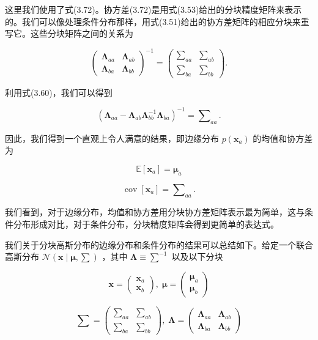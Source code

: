 \documentclass[10pt]{report}
\begin{document}
这里我们使用了式(3.72)。协方差(3.72)是用式(3.53)给出的分块精度矩阵来表示的。我们可以像处理条件分布那样，用式(3.51)给出的协方差矩阵的相应分块来重写它。这些分块矩阵之间的关系为

\[
{\left( \begin{array}{ll} {\mathbf{\Lambda }}_{aa} & {\mathbf{\Lambda }}_{ab} \\  {\mathbf{\Lambda }}_{ba} & {\mathbf{\Lambda }}_{bb} \end{array}\right) }^{-1} = \left( \begin{array}{ll} {\mathbf{\sum }}_{aa} & {\mathbf{\sum }}_{ab} \\  {\mathbf{\sum }}_{ba} & {\mathbf{\sum }}_{bb} \end{array}\right) . \tag{3.74}
\]

利用式(3.60)，我们可以得到

\[
{\left( {\mathbf{\Lambda }}_{aa} - {\mathbf{\Lambda }}_{ab}{\mathbf{\Lambda }}_{bb}^{-1}{\mathbf{\Lambda }}_{ba}\right) }^{-1} = {\mathbf{\sum }}_{aa}. \tag{3.75}
\]

因此，我们得到一个直观上令人满意的结果，即边缘分布 \(p\left( {\mathbf{x}}_{a}\right)\) 的均值和协方差为

\[
\mathbb{E}\left\lbrack  {\mathbf{x}}_{a}\right\rbrack   = {\mathbf{\mu }}_{a} \tag{3.76}
\]

\[
\operatorname{cov}\left\lbrack  {\mathbf{x}}_{a}\right\rbrack   = {\mathbf{\sum }}_{aa}. \tag{3.77}
\]

我们看到，对于边缘分布，均值和协方差用分块协方差矩阵表示最为简单，这与条件分布形成对比，对于条件分布，分块精度矩阵会得到更简单的表达式。

我们关于分块高斯分布的边缘分布和条件分布的结果可以总结如下。给定一个联合高斯分布 \(\mathcal{N}\left( {\mathbf{x} \mid  \mathbf{\mu },\mathbf{\sum }}\right)\) ，其中 \(\mathbf{\Lambda } \equiv  {\mathbf{\sum }}^{-1}\) 以及以下分块

\[
\mathbf{x} = \left( \begin{array}{l} {\mathbf{x}}_{a} \\  {\mathbf{x}}_{b} \end{array}\right) ,\;\mathbf{\mu } = \left( \begin{array}{l} {\mathbf{\mu }}_{a} \\  {\mathbf{\mu }}_{b} \end{array}\right)  \tag{3.78}
\]

\[
\mathbf{\sum } = \left( \begin{array}{ll} {\mathbf{\sum }}_{aa} & {\mathbf{\sum }}_{ab} \\  {\mathbf{\sum }}_{ba} & {\mathbf{\sum }}_{bb} \end{array}\right) ,\;\mathbf{\Lambda } = \left( \begin{array}{ll} {\mathbf{\Lambda }}_{aa} & {\mathbf{\Lambda }}_{ab} \\  {\mathbf{\Lambda }}_{ba} & {\mathbf{\Lambda }}_{bb} \end{array}\right)  \tag{3.79}
\]
\end{document}
